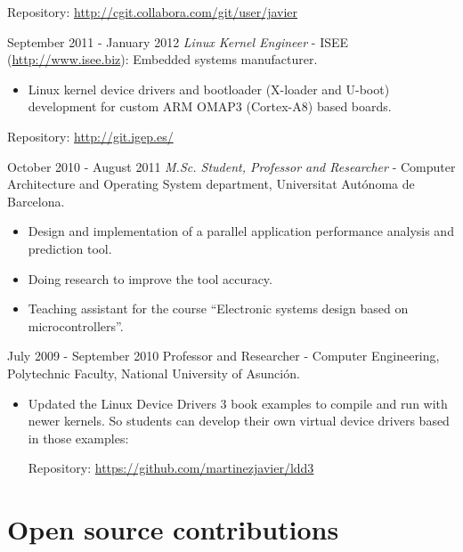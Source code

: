 \documentclass{simplecv}
\begin{document}
\begin{topic}
Repository: \url{http://cgit.collabora.com/git/user/javier}

\item[September 2011 - January 2012] \emph{Linux Kernel Engineer} - ISEE (\url{http://www.isee.biz}): Embedded systems manufacturer.

\begin{itemize}

\item Linux kernel device drivers and bootloader (X-loader and U-boot) development for custom ARM OMAP3 (Cortex-A8) based boards.

\end{itemize}

Repository: \url{http://git.igep.es/}

\item[October 2010 - August 2011] \emph{M.Sc. Student, Professor and Researcher} - Computer Architecture and Operating System department, Universitat Autónoma de Barcelona.

\begin{itemize}

\item Design and implementation of a parallel application performance analysis and prediction tool.

\item Doing research to improve the tool accuracy.

\item Teaching assistant for the course ``Electronic systems design based on microcontrollers''.

\end{itemize}

\item[July 2009 - September 2010] Professor and Researcher  - Computer Engineering, Polytechnic Faculty, National University of Asunción.

\begin{itemize}

\item Updated the Linux Device Drivers 3 book examples to compile and run with newer kernels. So students can develop their own virtual device drivers based in those examples:

Repository: \url{https://github.com/martinezjavier/ldd3}

\end{itemize}

\end{topic}

\section{Open source contributions}
\end{document}
